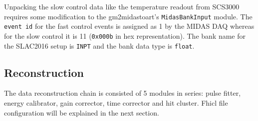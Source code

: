 Unpacking the slow control data like the temperature readout from SCS3000 requires some modification to the gm2midastoart's \verb+MidasBankInput+ module.
The \verb+event id+ for the fast control events is assigned as 1 by the MIDAS DAQ whereas for the slow control it is 11 (\verb+0x000b+ in hex representation).
The bank name for the SLAC2016 setup is \verb+INPT+ and the bank data type is \verb+float+.

\subsection{Reconstruction}
The data reconstruction chain is consisted of 5 modules in series: pulse fitter, energy calibrator, gain corrector, time corrector and hit cluster. Fhicl file configuration will be explained in the next section.